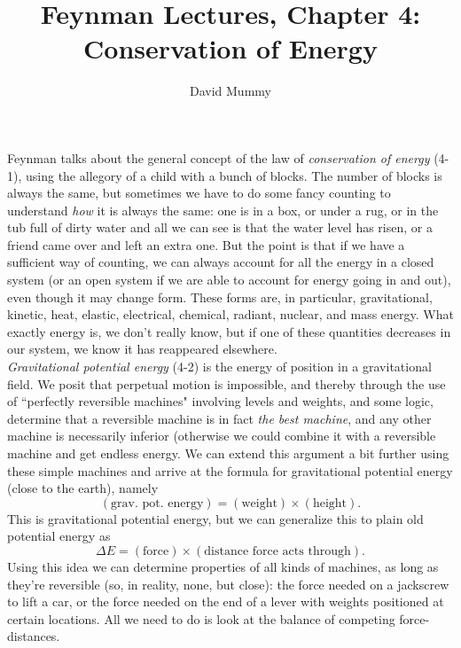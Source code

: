 \documentclass[10pt,letterpaper]{article}
\author{David Mummy}
\title{Feynman Lectures, Chapter 4: Conservation of Energy}
\begin{document}
\maketitle
\indent Feynman talks about the general concept of the law of \textit{conservation of energy} (4-1), using the allegory of a child with a bunch of blocks. The number of blocks is always the same, but sometimes we have to do some fancy counting to understand \textit{how} it is always the same: one is in a box, or under a rug, or in the tub full of dirty water and all we can see is that the water level has risen, or a friend came over and left an extra one. But the point is that if we have a sufficient way of counting, we can always account for all the energy in a closed system (or an open system if we are able to account for energy going in and out), even though it may change form. These forms are, in particular, gravitational, kinetic, heat, elastic, electrical, chemical, radiant, nuclear, and mass energy. What exactly energy is, we don't really know, but if one of these quantities decreases in our system, we know it has reappeared elsewhere. \\ 
\indent \textit{Gravitational potential energy} (4-2) is the energy of position in a gravitational field. We posit that perpetual motion is impossible, and thereby through the use of ``perfectly reversible machines" involving levels and weights, and some logic, determine that a reversible machine is in fact \textit{the best machine}, and any other machine is necessarily inferior (otherwise we could combine it with a reversible machine and get endless energy. We can extend this argument a bit further using these simple machines and arrive at the formula for gravitational potential energy (close to the earth), namely
$$
(\textrm{grav. pot. energy}) = (\textrm{weight})  \times (\textrm{height}).
$$
This is gravitational potential energy, but we can generalize this to plain old potential energy as 
$$
\Delta E = (\textrm{force})  \times  (\textrm{distance force acts through}).
$$
Using this idea we can determine properties of all kinds of machines, as long as they're reversible (so, in reality, none, but close): the force needed on a jackscrew to lift a car, or the force needed on the end of a lever with weights positioned at certain locations. All we need to do is look at the balance of competing force-distances.\\
\end{document}
